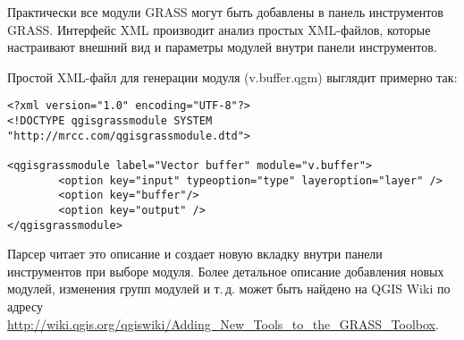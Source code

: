 Практически все модули GRASS могут быть добавлены в панель инструментов
GRASS. Интерфейс XML производит анализ простых XML-файлов, которые
настраивают внешний вид и параметры модулей внутри панели инструментов.

Простой XML-файл для генерации модуля 
(v.buffer.qgm) выглядит примерно так:
\begin{verbatim}
<?xml version="1.0" encoding="UTF-8"?>
<!DOCTYPE qgisgrassmodule SYSTEM "http://mrcc.com/qgisgrassmodule.dtd">

<qgisgrassmodule label="Vector buffer" module="v.buffer">
        <option key="input" typeoption="type" layeroption="layer" />
        <option key="buffer"/>
        <option key="output" />
</qgisgrassmodule>
\end{verbatim}

Парсер читает это описание и создает новую вкладку внутри панели
инструментов при выборе модуля. Более детальное описание добавления
новых модулей, изменения групп модулей и т.\,д. может быть найдено на
QGIS Wiki по адресу \\
\url{http://wiki.qgis.org/qgiswiki/Adding\_New\_Tools\_to\_the\_GRASS\_Toolbox}.

\FloatBarrier
